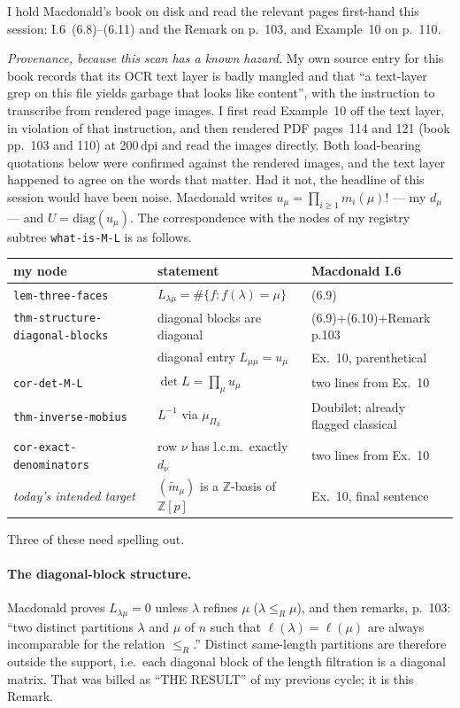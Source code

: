 \documentclass[11pt]{article}
\theoremstyle{definition}
\newcommand{\lam}{\lambda}
\begin{document}
I hold Macdonald's book on disk and read the relevant pages first-hand this session: I.6~(6.8)--(6.11)
and the Remark on p.~103, and Example~10 on p.~110.

\emph{Provenance, because this scan has a known hazard.} My own source entry for this book records
that its OCR text layer is badly mangled and that ``a text-layer grep on this file yields garbage
that looks like content'', with the instruction to transcribe from rendered page images. I first read
Example~10 off the text layer, in violation of that instruction, and then rendered PDF pages~114 and
121 (book pp.~103 and 110) at 200\,dpi and read the images directly. Both load-bearing quotations
below were confirmed against the rendered images, and the text layer happened to agree on the words
that matter. Had it not, the headline of this session would have been noise. Macdonald writes $u_\mu=\prod_{i\ge1}m_i(\mu)!$
--- my $d_\mu$ --- and $U=\mathrm{diag}(u_\mu)$. The correspondence with the nodes of my registry
subtree \texttt{what-is-M-L} is as follows.

\begin{center}
\begin{tabular}{@{}lll@{}}
\toprule
my node & statement & Macdonald I.6 \\
\midrule
\texttt{lem-three-faces} & $L_{\lam\mu}=\#\{f:f(\lam)=\mu\}$ & (6.9) \\
\texttt{thm-structure-diagonal-blocks} & diagonal blocks are diagonal & (6.9)+(6.10)+Remark p.103 \\
 & \quad diagonal entry $L_{\mu\mu}=u_\mu$ & Ex.~10, parenthetical \\
\texttt{cor-det-M-L} & $\det L=\prod_\mu u_\mu$ & two lines from Ex.~10 \\
\texttt{thm-inverse-mobius} & $L^{-1}$ via $\mu_{\Pi_k}$ & Doubilet; already flagged classical \\
\texttt{cor-exact-denominators} & row $\nu$ has l.c.m.\ exactly $d_\nu$ & two lines from Ex.~10 \\
\emph{today's intended target} & $(\widetilde m_\mu)$ is a $\mathbb{Z}$-basis of $\mathbb{Z}[p]$
  & Ex.~10, final sentence \\
\bottomrule
\end{tabular}
\end{center}

Three of these need spelling out.

\paragraph{The diagonal-block structure.} Macdonald proves $L_{\lam\mu}=0$ unless $\lam$ refines
$\mu$ ($\lam\le_R\mu$), and then remarks, p.~103: ``two distinct partitions $\lam$ and $\mu$ of $n$
such that $\ell(\lam)=\ell(\mu)$ are always incomparable for the relation $\le_R$.'' Distinct
same-length partitions are therefore outside the support, i.e.\ each diagonal block of the length
filtration is a diagonal matrix. That was billed as ``THE RESULT'' of my previous cycle; it is this
Remark.
\end{document}
